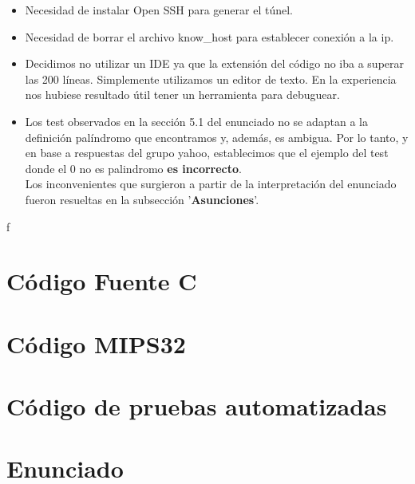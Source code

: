 \documentclass[a4paper,10pt]{article}
\begin{document}
\begin{itemize}
	\item Necesidad de instalar Open SSH para generar el t\'unel.
	\item Necesidad de borrar el archivo know\_host para establecer
	conexi\'on a la ip.
	\item Decidimos no utilizar un IDE ya que la extensi\'on del
	c\'odigo no iba a superar las 200 l\'ineas.
	Simplemente utilizamos un editor de texto.
	En la experiencia nos hubiese resultado \'util tener
	un herramienta para debuguear.
	\item Los test observados en la secci\'on 5.1 del enunciado no
	se adaptan a la definici\'on pal\'indromo que encontramos y,
	adem\'as, es ambigua. Por lo tanto, y en base a respuestas del
	grupo yahoo, establecimos que el ejemplo del test donde
	el 0 no es palindromo \textbf{es incorrecto}.\\
	Los inconvenientes que surgieron a partir de la interpretaci\'on
	del enunciado fueron resueltas en la subsecci\'on '\textbf{Asunciones}'.
\end{itemize}
f
\newpage
\section{C\'odigo Fuente C}


\newpage
\section{C\'odigo MIPS32}


\newpage
\section{C\'odigo de pruebas automatizadas}


\newpage
\section{Enunciado}


\end{document}
